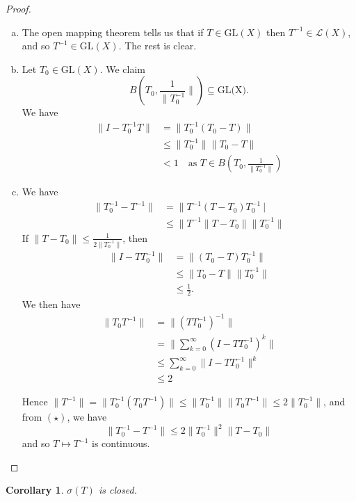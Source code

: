 \documentclass[10pt, reqno, oneside]{amsart}
\theoremstyle{plain}%
\newtheorem*{cor}{Corollary}
\theoremstyle{definition}
\theoremstyle{remark}
\begin{document}
\begin{proof}
	\begin{enumerate}[(a)]
		\item The open mapping theorem tells us that if $T \in \text{GL}(X)$ then $T^{-1} \in \mathcal L(X)$, and so $T^{-1} \in \text{GL}(X)$.  The rest is clear.
		\item Let $T_0 \in \text{GL}(X)$.  We claim \[
			B\left(T_0, \frac{1}{\| T_0^{-1}} \|\right) \subseteq \text{GL(X)}.
		\]  We have \begin{align*}
			\| I - T_0^{-1} T \| 	&= \| T_0^{-1}(T_0 - T) \| \\ 
									&\leq \| T_0^{-1} \| \| T_0 - T \| \\
									&< 1 \quad \text{as $T \in B\left(T_0, \frac{1}{\| T_0^{-1} \|}\right) $}
		\end{align*}
		\item We have \begin{align*}
			\| T_0^{-1} - T^{-1} \| &= \| T^{-1} ( T - T_0) T_0^{-1} \ | \\
									&\leq \| T^{-1} \| T - T_0 \| \| T_0^{-1} \| \tag{$\star$}
		\end{align*}  If $\| T - T_0 \| \leq \frac{1}{2 \| T_0^{-1} \|}$, then 
		\begin{align*}
			\| I - T T_0^{-1} \| &= \| (T_0 - T) T_0^{-1} \| \\
								&\leq \| T_0 - T \| \| T_0^{-1} \| \\
								&\leq \frac{1}{2}.
		\end{align*}  We then have 
		\begin{align*}
			\| T_0 T^{-1} \| 	&= \| (T T_0^{-1})^{-1} \| \\
								&= \| \sum_{k=0}^\infty ( I - T T_0^{-1})^k \| \\
								&\leq \sum_{k=0}^\infty \| I - T T_0^{-1} \|^k \\
								&\leq 2
		\end{align*} 
		
		Hence $\|T^{-1}\| = \|T_0^{-1}( T_0 T^{-1}) \| \leq \| T_0^{-1} \| \| T_0 T^{-1} \| \leq 2 \| T_0^{-1} \|$, and from $(\star)$, we have \[
			\| T_0^{-1} - T^{-1} \| \leq 2 \| T_0^{-1} \|^2 \| T - T_0 \|
		\] and so $T \mapsto T^{-1}$ is continuous.  
	\end{enumerate}
\end{proof}

\begin{cor}
	$\sigma(T)$ is closed.
\end{cor}
\end{document}
